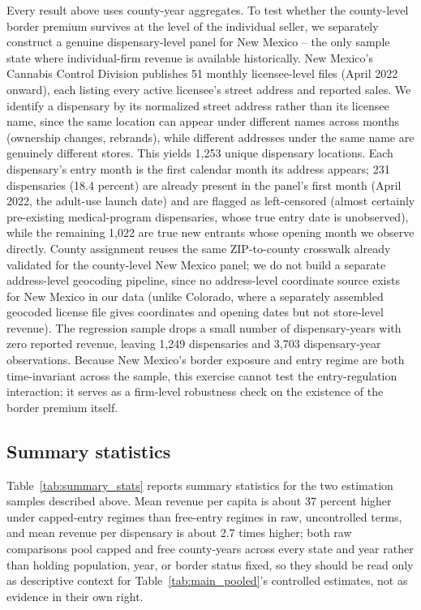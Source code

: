 \documentclass[12pt]{article}
\begin{document}
Every result above uses county-year aggregates. To test whether the county-level border premium survives at
the level of the individual seller, we separately construct a genuine dispensary-level panel for New Mexico --
the only sample state where individual-firm revenue is available historically. New Mexico's Cannabis Control
Division publishes 51 monthly licensee-level files (April 2022 onward), each listing every active licensee's
street address and reported sales. We identify a dispensary by its normalized street address rather than its
licensee name, since the same location can appear under different names across months (ownership changes,
rebrands), while different addresses under the same name are genuinely different stores. This yields 1{,}253
unique dispensary locations. Each dispensary's entry month is the first calendar month its address appears;
231 dispensaries (18.4 percent) are already present in the panel's first month (April 2022, the adult-use
launch date) and are flagged as left-censored (almost certainly pre-existing medical-program dispensaries,
whose true entry date is unobserved), while the remaining 1{,}022 are true new entrants whose opening month we
observe directly. County assignment reuses the same ZIP-to-county crosswalk already validated for the
county-level New Mexico panel; we do not build a separate address-level geocoding pipeline, since no
address-level coordinate source exists for New Mexico in our data (unlike Colorado, where a separately
assembled geocoded license file gives coordinates and opening dates but not store-level revenue). The
regression sample drops a small number of dispensary-years with zero reported revenue, leaving 1{,}249
dispensaries and 3{,}703 dispensary-year observations. Because New Mexico's border exposure and entry regime
are both time-invariant across the sample, this exercise cannot test the entry-regulation interaction; it
serves as a firm-level robustness check on the existence of the border premium itself.

\subsection{Summary statistics}
\label{sec:summarystats}



Table~\ref{tab:summary_stats} reports summary statistics for the two estimation samples described above. Mean
revenue per capita is about 37 percent higher under capped-entry regimes than free-entry regimes in raw,
uncontrolled terms, and mean revenue per dispensary is about 2.7 times higher; both raw comparisons pool
capped and free county-years across every state and year rather than holding population, year, or border
status fixed, so they should be read only as descriptive context for Table~\ref{tab:main_pooled}'s controlled
estimates, not as evidence in their own right.
\end{document}
